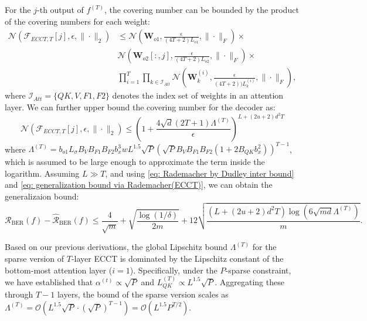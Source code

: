 \documentclass[lettersize,onecolumn]{IEEEtran}
\begin{document}
For the $j$-th output of $f^{(T)}$, the covering number can be bounded by the product of the covering numbers for each weight:
\begin{equation}
\begin{aligned}
        \mathcal{N}(\mathcal{F}_{ECCT,T}[j],\epsilon,\|\cdot\|_{2}) &\leq \mathcal{N}\left(\mathbf{W}_{o1}, \frac{\epsilon}{(4T+2) L_{o1}}, \| \cdot \|_{F}\right) \times \\
        &\mathcal{N}\left(\mathbf{W}_{o2}[:,j], \frac{\epsilon}{(4T+2) L_{o2}}, \| \cdot \|_{F}\right) \times \\ 
        &\prod_{i=1}^{T}\prod_{k\in \mathcal{I}_{Att}} \mathcal{N}(\mathbf{W}_{k}^{(i)},\frac{\epsilon}{(4T+2))L_{k}^{(i)}},\|\cdot\|_{F}), 
        \label{eq: global covering number upper bound (prod), multi-layer}
 \end{aligned}       
\end{equation}
where $\mathcal{I}_{Att}=\{QK, V,F1, F2\}$ denotes the index set of weights in an attention layer. We can further upper bound the covering number for the decoder as:
\begin{equation}
    \mathcal{N}(\mathcal{F}_{ECCT,T}[j],\epsilon,\|\cdot\|_{2})  \leq \left(1+\frac{4\sqrt{d}(2T+1)\Lambda^{(T)}}{\epsilon}\right)^{L+(2u+2)d^{2}T}
\end{equation}
where $\Lambda^{(T)}=b_{o1}L_{\sigma}B_{V}B_{F1}B_{F2}b_{x}^{3}wL^{1.5}\sqrt{P}\left(\sqrt{P}B_{V}B_{F1}B_{F2}(1+2B_{QK}b_{x}^{2})\right)^{T-1}$, which is assumed to be large enough to approximate the term inside the logarithm. Assuming $L \gg T$, and using \eqref{eq: Rademacher by Dudley inter bound} and \eqref{eq: generalization bound via Rademacher(ECCT)}, we can obtain the generalizaion bound:
\begin{equation}
    \mathcal{R}_{\mathrm{BER}}(f)-\hat{\mathcal{R}}_{\mathrm{BER}}(f) \leq \frac{4}{\sqrt{m}}+\sqrt{\frac{\log (1 / \delta)}{2 m}}+12 \sqrt{\frac{(L+(2 u+2) d^{2} T) \log (6 \sqrt{m d}\Lambda^{(T)}) }{m}}.
\end{equation}

Based on our previous derivations, the global Lipschitz bound $\Lambda^{(T)}$ for the sparse version of $T$-layer ECCT is dominated by the Lipschitz constant of the bottom-most attention layer ($i=1$). Specifically, under the $P$-sparse constraint, we have established that $\alpha^{(t)} \propto \sqrt{P}$ and $L_{QK}^{(T)}\propto L^{1.5}\sqrt{P}$. Aggregating these through $T-1$ layers, the bound of the sparse version scales as $\Lambda^{(T)} = \mathcal{O} \left( L^{1.5}\sqrt{P} \cdot (\sqrt{P})^{T-1} \right) = \mathcal{O} \left( L^{1.5} P^{T/2} \right)$.
\end{document}
